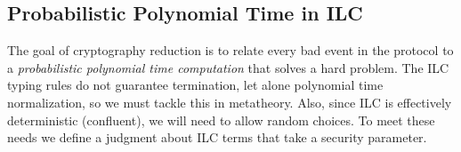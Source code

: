 
\subsection{Probabilistic Polynomial Time in ILC}
\label{subsec:ppt}
The goal of cryptography reduction is to relate every bad event in the protocol to a \emph{probabilistic polynomial time computation} that solves a hard problem.
The ILC typing rules do not guarantee termination, let alone polynomial time normalization, so we must tackle this in metatheory.
Also, since ILC is effectively deterministic (confluent), we will need to allow random choices.
To meet these needs we define a judgment about ILC terms that take a security parameter.

